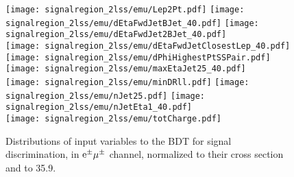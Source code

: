 \begin{figure} [!h]
  \centering
  \texttt{[image: signalregion\_2lss/emu/Lep2Pt.pdf]}
  \texttt{[image: signalregion\_2lss/emu/dEtaFwdJetBJet\_40.pdf]}
  \texttt{[image: signalregion\_2lss/emu/dEtaFwdJet2BJet\_40.pdf]}\\
  \texttt{[image: signalregion\_2lss/emu/dEtaFwdJetClosestLep\_40.pdf]} 
  \texttt{[image: signalregion\_2lss/emu/dPhiHighestPtSSPair.pdf]}
  \texttt{[image: signalregion\_2lss/emu/maxEtaJet25\_40.pdf]}\\
  \texttt{[image: signalregion\_2lss/emu/minDRll.pdf]}
  \texttt{[image: signalregion\_2lss/emu/nJet25.pdf]} 
  \texttt{[image: signalregion\_2lss/emu/nJetEta1\_40.pdf]}\\
  \texttt{[image: signalregion\_2lss/emu/totCharge.pdf]}
  \caption{Distributions of input variables to the BDT for signal discrimination, in $\textrm{e}^\pm\mu^\pm$ channel, normalized to their cross section and to 35.9\fbinv.}
  \label{fig:input_vars_2lss_xsec_emu}
\end{figure}



